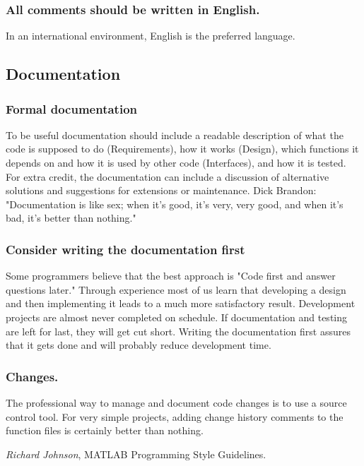 \documentclass[titlepage,a4paper,12pt]{article}
\begin{document}



\subsubsection{All comments should be written in English.}

In an international environment, English is the preferred language.


\subsection{Documentation}

\subsubsection{Formal documentation}

 To be useful documentation should include a
readable description of what the code is supposed to do
(Requirements), how it works (Design), which functions it depends on
and how it is used by other code (Interfaces), and how it is tested.
For extra credit, the documentation can include a discussion of
alternative solutions and suggestions for extensions or maintenance.
Dick Brandon: "Documentation is like sex; when it's good, it's very,
very good, and when it's bad, it's better than nothing."


\subsubsection{Consider writing the documentation first}

 Some programmers believe
that the best approach is "Code first and answer questions later."
Through experience most of us learn that developing a design and
then implementing it leads to a much more satisfactory result.
Development projects are almost never completed on schedule. If
documentation and testing are left for last, they will get cut
short. Writing the documentation first assures that it gets done and
will probably reduce development time.

\subsubsection{Changes.}

 The professional way to manage and document code changes is
to use a source control tool. For very simple projects, adding change history comments to the
function files is certainly better than nothing.

\begin{thebibliography}{9}
\emph{Richard Johnson}, MATLAB Programming Style Guidelines.
\end{thebibliography}
\end{document}
